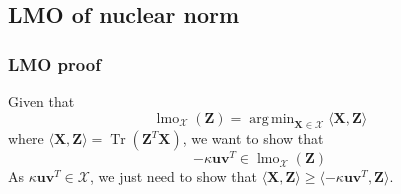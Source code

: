 \documentclass[12pt]{article}
\DeclareMathOperator*{\argmin}{arg\,min}
\DeclareMathOperator*{\lmo}{lmo}
\DeclareMathOperator*{\tr}{Tr}
\newcommand{\boldZ}{\mathbf{Z}}
\newcommand{\boldX}{\mathbf{X}}
\newcommand{\setX}{\mathcal{X}}
\newcommand{\boldu}{\mathbf{u}}
\newcommand{\boldv}{\mathbf{v}}
\begin{document}
\subsection{LMO of nuclear norm}
\subsubsection{LMO proof}
Given that
\begin{equation}
    \lmo_{\setX}(\boldZ) = \argmin_{\boldX \in \setX} \langle \boldX, \boldZ \rangle
\end{equation}
where $\langle \boldX, \boldZ \rangle = \tr(\boldZ^T\boldX)$, we want to show that
\begin{equation}
    -\kappa \boldu \boldv^T \in \lmo_{\setX}(\boldZ)
\end{equation}
As $\kappa \boldu \boldv^T \in \setX$, we just need to show that $\langle \boldX, \boldZ \rangle \geq \langle -\kappa \boldu \boldv^T, \boldZ \rangle$.
\end{document}
